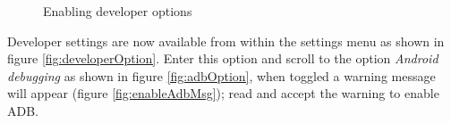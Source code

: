 \begin{figure}[H]
  \centering
  \qquad
  \caption{Enabling developer options}
  \label{fig:enablingDeveloperoptions}
\end{figure}

Developer settings are now available from within the settings menu as
shown in figure \ref{fig:developerOption}. Enter this option and scroll
to the option \emph{Android debugging} as shown in figure
\ref{fig:adbOption}, when toggled a warning message will appear (figure
\ref{fig:enableAdbMsg}); read and accept the warning to enable ADB.

